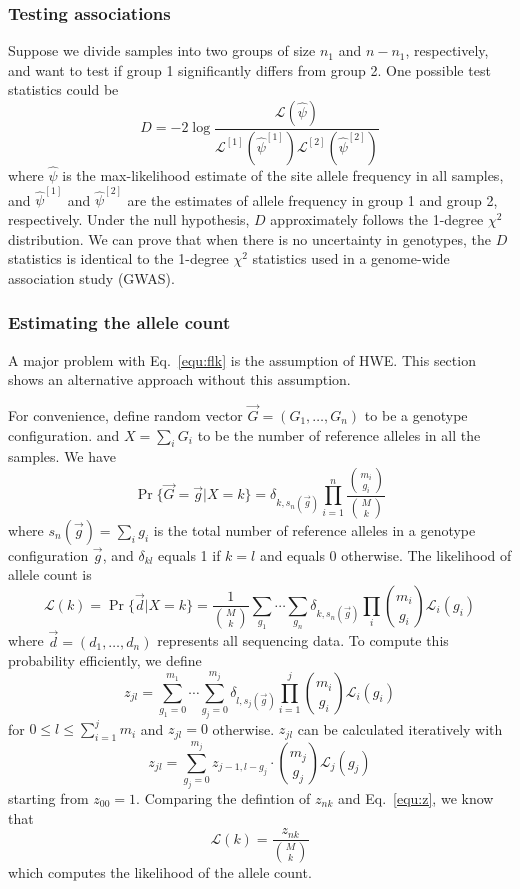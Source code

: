 \documentclass{bioinfo}
\begin{document}
\begin{methods}
\subsubsection{Testing associations}
Suppose we divide samples into two groups of size $n_1$ and $n-n_1$, respectively, and
want to test if group 1 significantly differs from group 2. One possible test statistics
could be
\begin{equation}
D=-2\log\frac{\mathcal{L}(\hat{\psi})}{\mathcal{L}^{[1]}(\hat{\psi}^{[1]})\mathcal{L}^{[2]}(\hat{\psi}^{[2]})}
\end{equation}
where $\hat{\psi}$ is the max-likelihood estimate of the site allele frequency in all samples,
and $\hat{\psi}^{[1]}$ and $\hat{\psi}^{[2]}$ are the estimates of allele frequency in group 1 and group 2, respectively.
Under the null hypothesis, $D$ approximately follows the 1-degree $\chi^2$ distribution.
We can prove that when there is no uncertainty in genotypes, the $D$ statistics
is identical to the 1-degree $\chi^2$ statistics used in a genome-wide association study (GWAS).

\subsubsection{Estimating the allele count}
A major problem with Eq.~\eqref{equ:flk} is the assumption of HWE. This section
shows an alternative approach without this assumption.

For convenience, define random vector $\vec{G}=(G_1,\ldots,G_n)$ to be a genotype configuration.
and $X=\sum_iG_i$ to be the number of reference alleles in all the samples.
We have
$$
\Pr\{\vec{G}=\vec{g}|X=k\}=\delta_{k,s_n(\vec{g})}\prod_{i=1}^n\frac{\binom{m_i}{g_i}}{\binom{M}{k}}
$$
where $s_n(\vec{g})=\sum_i g_i$ is the total
number of reference alleles in a genotype configuration $\vec{g}$, and $\delta_{kl}$ equals 1 if $k=l$
and equals 0 otherwise. The likelihood of allele count is
\begin{equation}\label{equ:klk}
\mathcal{L}(k)=\Pr\{\vec{d}|X=k\}=\frac{1}{\binom{M}{k}}\sum_{g_1}\cdots\sum_{g_n}\delta_{k,s_n(\vec{g})}\prod_i\binom{m_i}{g_i}\mathcal{L}_i(g_i)
\end{equation}
where $\vec{d}=(d_1,\ldots,d_n)$ represents all sequencing data. To compute this probability efficiently, we define
$$
z_{jl}=\sum_{g_1=0}^{m_1}\cdots\sum_{g_j=0}^{m_j}\delta_{l,s_j(\vec{g})}\prod_{i=1}^j\binom{m_i}{g_i}\mathcal{L}_i(g_i)
$$
for $0\le l\le \sum_{i=1}^jm_i$ and $z_{jl}=0$ otherwise. $z_{jl}$
can be calculated iteratively with
\begin{equation}\label{equ:z}
z_{jl}=\sum_{g_j=0}^{m_j}z_{j-1,l-g_j}\cdot\binom{m_j}{g_j}\mathcal{L}_j(g_j)
\end{equation}
starting from $z_{00}=1$. Comparing the defintion of $z_{nk}$ and Eq.~\eqref{equ:z}, we know that
\begin{equation}\label{equ:klk2}
\mathcal{L}(k)=\frac{z_{nk}}{\binom{M}{k}}
\end{equation}
which computes the likelihood of the allele count.


\end{methods}
\end{document}
